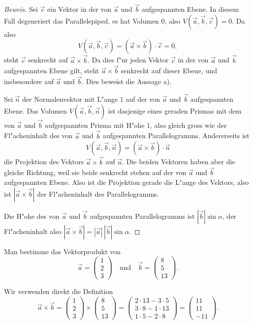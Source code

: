 \begin{proof}[Beweis]
Sei $\vec c$ ein Vektor in der von $\vec a$ und $\vec b$ aufgespannten
Ebene. In diesem Fall degeneriert das Parallelepiped, es hat Volumen $0$,
also $V(\vec a,\vec b,\vec c)= 0$.
Da also
\[
V(\vec a,\vec b,\vec c)=(\vec a\times \vec b)\cdot \vec c=0,
\]
steht $\vec c$ senkrecht auf $\vec a\times\vec b$. Da dies f"ur jeden
Vektor $\vec c$ in der von $\vec a$ und $\vec b$ aufgespannten Ebene
gilt, steht $\vec a\times\vec b$ senkrecht auf dieser Ebene, und insbesondere
auf $\vec a$ und $\vec b$. Dies beweist die Aussage a).

Sei $\vec n$ der Normalenvektor mit L"ange $1$ auf der von $\vec a$ und
$\vec b$ aufgespannten Ebene. Das Volumen $V(\vec a,\vec b,\vec n)$ ist
dasjenige eines geraden Prismas mit dem von $\vec a$ und $\vec b$
aufgespannten Prisma mit H"ohe $1$, also gleich gross wie der
Fl"acheninhalt des von $\vec a$ und $\vec b$ aufgespannten Parallelogramms.
Andererseits ist
\[
V(\vec a,\vec b,\vec n)=(\vec a\times\vec b)\cdot \vec n
\]
die Projektion des Vektors $\vec a\times\vec b$ auf $\vec n$. Die beiden
Vektoren haben aber die gleiche Richtung, weil sie beide senkrecht stehen
auf der von $\vec a$ und $\vec b$ aufgespannten Ebene. Also ist die Projektion
gerade die L"ange des Vektors, also ist
$|\vec a\times\vec b|$ der Fl"acheninhalt des Parallelogramms.

Die H"ohe des von $\vec a$ und $\vec b$ aufgespannten Parallelogramms 
ist $|\vec b|\sin \alpha$, der Fl"acheninhalt also
$|\vec a\times\vec b|=|\vec a|\,|\vec b|\sin\alpha.$
\end{proof}

\begin{beispiel}
Man bestimme das Vektorprodukt von
\[
\vec a=\begin{pmatrix}1\\2\\3\end{pmatrix} 
\quad\text{und}\quad
\vec b=\begin{pmatrix}8\\5\\13\end{pmatrix}.
\]

\smallskip
{\parindent 0pt Wir verwenden direkt die Definition}
\[
\vec a\times \vec b=
\begin{pmatrix}1\\2\\3\end{pmatrix} 
\times
\begin{pmatrix}8\\5\\13\end{pmatrix}
=
\begin{pmatrix}
2\cdot 13-3\cdot 5\\
3\cdot 8-1\cdot 13\\
1\cdot 5-2\cdot 8
\end{pmatrix}
=
\begin{pmatrix}
11\\
11\\
-11
\end{pmatrix}.
\]
\end{beispiel}


